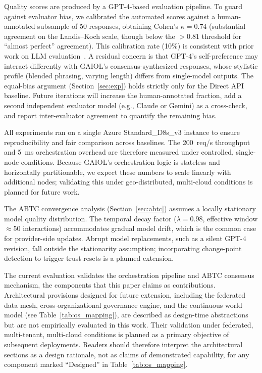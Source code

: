 \documentclass{iopjournal}
\begin{document}
Quality scores are produced by a GPT-4-based evaluation pipeline. To guard against evaluator bias, we calibrated the automated scores against a human-annotated subsample of 50 responses, obtaining Cohen's $\kappa = 0.74$ (substantial agreement on the Landis--Koch scale, though below the $> 0.81$ threshold for ``almost perfect'' agreement). This calibration rate (10\%) is consistent with prior work on LLM evaluation~\cite{HolisticEval}. A residual concern is that GPT-4's self-preference may interact differently with GAIOL's consensus-synthesized responses, whose stylistic profile (blended phrasing, varying length) differs from single-model outputs. The equal-bias argument (Section~\ref{sec:exp}) holds strictly only for the Direct API baseline. Future iterations will increase the human-annotated fraction, add a second independent evaluator model (e.g., Claude or Gemini) as a cross-check, and report inter-evaluator agreement to quantify the remaining bias.

All experiments ran on a single Azure Standard\_D8s\_v3 instance to ensure reproducibility and fair comparison across baselines. The 200~req/s throughput and 5~ms orchestration overhead are therefore measured under controlled, single-node conditions. Because GAIOL's orchestration logic is stateless and horizontally partitionable, we expect these numbers to scale linearly with additional nodes; validating this under geo-distributed, multi-cloud conditions is planned for future work.

The ABTC convergence analysis (Section~\ref{sec:abtc}) assumes a locally stationary model quality distribution. The temporal decay factor ($\lambda = 0.98$, effective window $\approx$50 interactions) accommodates gradual model drift, which is the common case for provider-side updates. Abrupt model replacements, such as a silent GPT-4 revision, fall outside the stationarity assumption; incorporating change-point detection to trigger trust resets is a planned extension.

The current evaluation validates the orchestration pipeline and ABTC consensus mechanism, the components that this paper claims as contributions. Architectural provisions designed for future extension, including the federated data mesh, cross-organizational governance engine, and the continuous world model (see Table~\ref{tab:os_mapping}), are described as design-time abstractions but are not empirically evaluated in this work. Their validation under federated, multi-tenant, multi-cloud conditions is planned as a primary objective of subsequent deployments. Readers should therefore interpret the architectural sections as a design rationale, not as claims of demonstrated capability, for any component marked ``Designed'' in Table~\ref{tab:os_mapping}.
\end{document}
